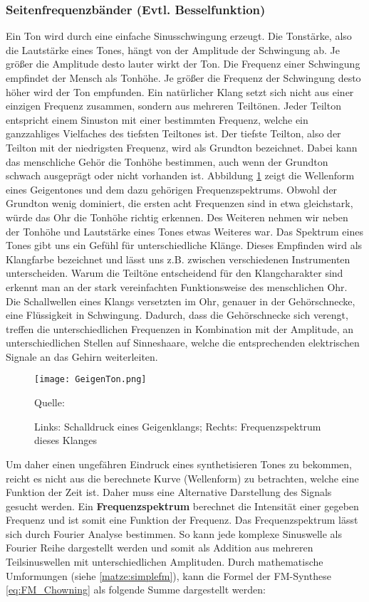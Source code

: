 \subsubsection{Seitenfrequenzbänder (Evtl. Besselfunktion)}
\label{bulli:ohrToeneUndFrequenzen}
Ein Ton wird durch eine einfache Sinusschwingung erzeugt. Die Tonstärke, also die Lautstärke eines Tones, hängt von der Amplitude der Schwingung ab. Je größer die Amplitude desto lauter wirkt der Ton. Die Frequenz einer Schwingung empfindet der Mensch als Tonhöhe. Je größer die Frequenz der Schwingung desto höher wird der Ton empfunden. 
Ein natürlicher Klang setzt sich nicht aus einer einzigen Frequenz zusammen, sondern aus mehreren Teiltönen. Jeder Teilton entspricht einem Sinuston mit einer bestimmten Frequenz, welche ein ganzzahliges Vielfaches des tiefsten Teiltones ist. Der tiefste Teilton, also der Teilton mit der niedrigsten Frequenz, wird als Grundton bezeichnet. \cite[S. 87]{borucki} 
Dabei kann das menschliche Gehör die Tonhöhe bestimmen, auch wenn der Grundton schwach ausgeprägt oder nicht vorhanden ist. \cite[S. 4]{zwicker} Abbildung \ref{fig:geige} zeigt die Wellenform eines Geigentones und dem dazu gehörigen Frequenzspektrums. Obwohl der Grundton wenig dominiert, die ersten acht Frequenzen sind in etwa gleichstark, würde das Ohr die Tonhöhe richtig erkennen. Des Weiteren nehmen wir neben der Tonhöhe und Lautstärke eines Tones etwas Weiteres war. Das Spektrum eines Tones gibt uns ein Gefühl für unterschiedliche Klänge. Dieses Empfinden wird als Klangfarbe bezeichnet und lässt uns z.B. zwischen verschiedenen Instrumenten unterscheiden. \cite[S. 5]{zwicker} \cite[S. 226]{raichel}
Warum die Teiltöne entscheidend für den Klangcharakter sind erkennt man an der stark vereinfachten Funktionsweise des menschlichen Ohr. Die Schallwellen eines Klangs versetzten im Ohr, genauer in der Gehörschnecke, eine Flüssigkeit in Schwingung. Dadurch, dass die Gehörschnecke sich verengt, treffen die unterschiedlichen Frequenzen in Kombination mit der Amplitude, an unterschiedlichen Stellen auf Sinneshaare, welche die entsprechenden elektrischen Signale an das Gehirn weiterleiten. \cite[S. 87 f.]{zwicker}
\begin{figure} [ht]
\centering
  \texttt{[image: GeigenTon.png]}
\caption{Links: Schalldruck eines Geigenklangs; Rechts: Frequenzspektrum dieses Klanges}
\label{fig:geige}
Quelle: \cite[S. 4]{zwicker}
\end{figure}
\FloatBarrier

Um daher einen ungefähren Eindruck eines synthetisieren Tones zu bekommen, reicht es nicht aus die berechnete Kurve (Wellenform) zu betrachten, welche eine Funktion der Zeit ist. Daher muss eine Alternative Darstellung des Signals gesucht werden. Ein \textbf{Frequenzspektrum} berechnet die Intensität einer gegeben Frequenz und ist somit eine Funktion der Frequenz. Das Frequenzspektrum lässt sich durch Fourier Analyse bestimmen. So kann jede komplexe Sinuswelle als Fourier Reihe dargestellt werden und somit als Addition aus mehreren Teilsinuswellen mit unterschiedlichen Amplituden. \cite[S. 33]{raichel} Durch mathematische Umformungen (siehe \ref{matze:simplefm}), kann die Formel der FM-Synthese \ref{eq:FM_Chowning} als folgende Summe dargestellt werden: \cite{chowningPaper}


